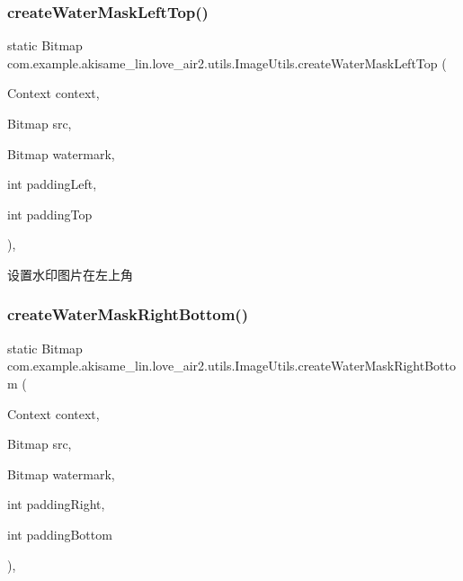 \subsubsection{\texorpdfstring{createWaterMaskLeftTop()}{createWaterMaskLeftTop()}}
{\footnotesize\ttfamily static Bitmap com.\+example.\+akisame\+\_\+lin.\+love\+\_\+air2.\+utils.\+Image\+Utils.\+create\+Water\+Mask\+Left\+Top (\begin{DoxyParamCaption}\item[{Context}]{context,  }\item[{Bitmap}]{src,  }\item[{Bitmap}]{watermark,  }\item[{int}]{padding\+Left,  }\item[{int}]{padding\+Top }\end{DoxyParamCaption})\hspace{0.3cm}{\ttfamily [inline]}, {\ttfamily [static]}}

设置水印图片在左上角 \mbox{\label{classcom_1_1example_1_1akisame__lin_1_1love__air2_1_1utils_1_1_image_utils_a06e01f63d46bba8b15d9779bccc176d1}} 
\subsubsection{\texorpdfstring{createWaterMaskRightBottom()}{createWaterMaskRightBottom()}}
{\footnotesize\ttfamily static Bitmap com.\+example.\+akisame\+\_\+lin.\+love\+\_\+air2.\+utils.\+Image\+Utils.\+create\+Water\+Mask\+Right\+Bottom (\begin{DoxyParamCaption}\item[{Context}]{context,  }\item[{Bitmap}]{src,  }\item[{Bitmap}]{watermark,  }\item[{int}]{padding\+Right,  }\item[{int}]{padding\+Bottom }\end{DoxyParamCaption})\hspace{0.3cm}{\ttfamily [inline]}, {\ttfamily [static]}}

